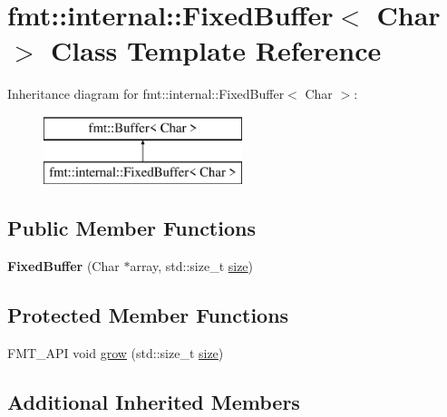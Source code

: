 \hypertarget{classfmt_1_1internal_1_1FixedBuffer}{}\section{fmt\+:\+:internal\+:\+:Fixed\+Buffer$<$ Char $>$ Class Template Reference}
\label{classfmt_1_1internal_1_1FixedBuffer}
Inheritance diagram for fmt\+:\+:internal\+:\+:Fixed\+Buffer$<$ Char $>$\+:\begin{figure}[H]
\begin{center}
\leavevmode
\includegraphics[height=2.000000cm]{classfmt_1_1internal_1_1FixedBuffer}
\end{center}
\end{figure}
\subsection*{Public Member Functions}
\begin{DoxyCompactItemize}
\item 
{\bfseries Fixed\+Buffer} (Char $\ast$array, std\+::size\+\_\+t \hyperlink{classfmt_1_1Buffer_a14fa72f0ddf584c14ffffb1446f598aa}{size})\hypertarget{classfmt_1_1internal_1_1FixedBuffer_a33c430838198b38592c7e9f4f6fd62d8}{}\label{classfmt_1_1internal_1_1FixedBuffer_a33c430838198b38592c7e9f4f6fd62d8}

\end{DoxyCompactItemize}
\subsection*{Protected Member Functions}
\begin{DoxyCompactItemize}
\item 
F\+M\+T\+\_\+\+A\+PI void \hyperlink{classfmt_1_1internal_1_1FixedBuffer_a90dc1dce4e8eac799d57ca519cfeb82d}{grow} (std\+::size\+\_\+t \hyperlink{classfmt_1_1Buffer_a14fa72f0ddf584c14ffffb1446f598aa}{size})
\end{DoxyCompactItemize}
\subsection*{Additional Inherited Members}



